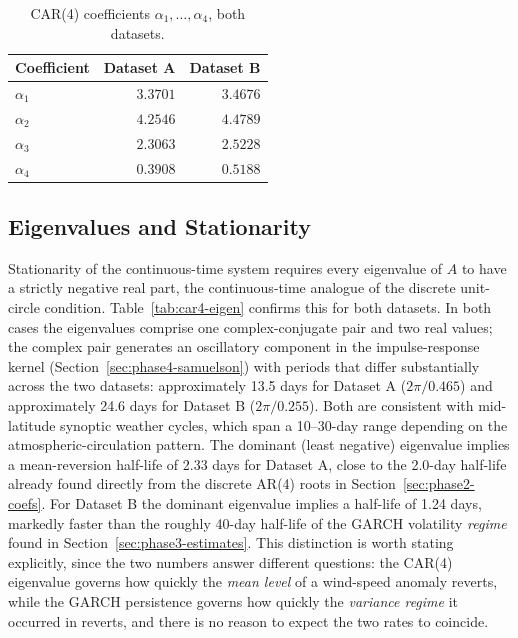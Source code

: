 \begin{table}[htbp]
\centering
\caption{CAR(4) coefficients $\alpha_1,\dots,\alpha_4$, both datasets.}
\label{tab:car4-alpha}
\begin{tabular}{l r r}
\toprule
\textbf{Coefficient} & \textbf{Dataset A} & \textbf{Dataset B} \\
\midrule
$\alpha_1$ & $3.3701$ & $3.4676$ \\
$\alpha_2$ & $4.2546$ & $4.4789$ \\
$\alpha_3$ & $2.3063$ & $2.5228$ \\
$\alpha_4$ & $0.3908$ & $0.5188$ \\
\bottomrule
\end{tabular}
\end{table}

\subsection{Eigenvalues and Stationarity}
\label{sec:phase4-eigen}

Stationarity of the continuous-time system requires every eigenvalue of $A$ to have a strictly negative real part, the continuous-time analogue of the discrete unit-circle condition. Table~\ref{tab:car4-eigen} confirms this for both datasets. In both cases the eigenvalues comprise one complex-conjugate pair and two real values; the complex pair generates an oscillatory component in the impulse-response kernel (Section~\ref{sec:phase4-samuelson}) with periods that differ substantially across the two datasets: approximately 13.5 days for Dataset A ($2\pi/0.465$) and approximately 24.6 days for Dataset B ($2\pi/0.255$). Both are consistent with mid-latitude synoptic weather cycles, which span a 10--30-day range depending on the atmospheric-circulation pattern. The dominant (least negative) eigenvalue implies a mean-reversion half-life of 2.33 days for Dataset A, close to the 2.0-day half-life already found directly from the discrete AR(4) roots in Section~\ref{sec:phase2-coefs}. For Dataset B the dominant eigenvalue implies a half-life of 1.24 days, markedly faster than the roughly 40-day half-life of the GARCH volatility \emph{regime} found in Section~\ref{sec:phase3-estimates}. This distinction is worth stating explicitly, since the two numbers answer different questions: the CAR(4) eigenvalue governs how quickly the \emph{mean level} of a wind-speed anomaly reverts, while the GARCH persistence governs how quickly the \emph{variance regime} it occurred in reverts, and there is no reason to expect the two rates to coincide.

